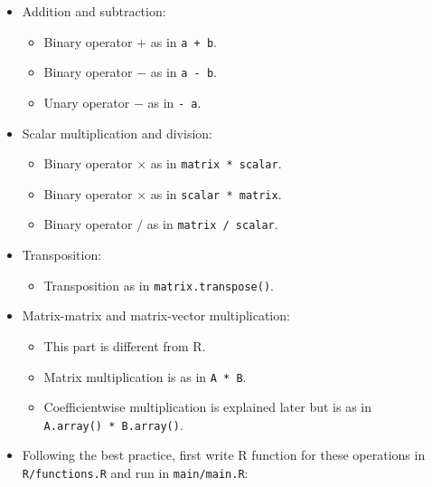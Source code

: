 \documentclass[
]{book}
\providecommand{\tightlist}{%
  \setlength{\itemsep}{0pt}\setlength{\parskip}{0pt}}
\begin{document}
\begin{itemize}
\tightlist
\item
  Addition and subtraction:

  \begin{itemize}
  \tightlist
  \item
    Binary operator \(+\) as in \texttt{a\ +\ b}.
  \item
    Binary operator \(-\) as in \texttt{a\ -\ b}.
  \item
    Unary operator \(-\) as in \texttt{-\ a}.
  \end{itemize}
\item
  Scalar multiplication and division:

  \begin{itemize}
  \tightlist
  \item
    Binary operator \(\times\) as in \texttt{matrix\ *\ scalar}.
  \item
    Binary operator \(\times\) as in \texttt{scalar\ *\ matrix}.
  \item
    Binary operator \(/\) as in \texttt{matrix\ /\ scalar}.
  \end{itemize}
\item
  Transposition:

  \begin{itemize}
  \tightlist
  \item
    Transposition as in \texttt{matrix.transpose()}.
  \end{itemize}
\item
  Matrix-matrix and matrix-vector multiplication:

  \begin{itemize}
  \tightlist
  \item
    This part is different from R.
  \item
    Matrix multiplication is as in \texttt{A\ *\ B}.
  \item
    Coefficientwise multiplication is explained later but is as in \texttt{A.array()\ *\ B.array()}.
  \end{itemize}
\item
  Following the best practice, first write R function for these operations in \texttt{R/functions.R} and run in \texttt{main/main.R}:
\end{itemize}
\end{document}
